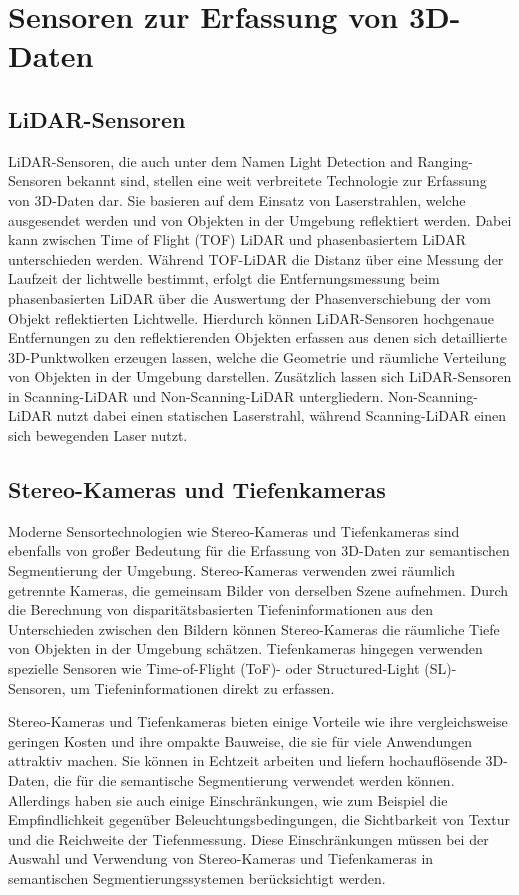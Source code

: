 \chapter{Sensoren zur Erfassung von 3D-Daten}

\section{LiDAR-Sensoren}
LiDAR-Sensoren, die auch unter dem Namen Light Detection and Ranging-Sensoren
bekannt sind, stellen eine weit verbreitete Technologie zur Erfassung von
3D-Daten dar. Sie basieren auf dem Einsatz von Laserstrahlen, welche
ausgesendet werden und von Objekten in der Umgebung reflektiert werden. Dabei
kann zwischen Time of Flight (TOF) LiDAR und phasenbasiertem LiDAR
unterschieden werden. Während TOF-LiDAR die Distanz über eine Messung der
Laufzeit der lichtwelle bestimmt, erfolgt die Entfernungsmessung beim
phasenbasierten LiDAR über die Auswertung der Phasenverschiebung der vom Objekt
reflektierten Lichtwelle. Hierdurch können LiDAR-Sensoren hochgenaue
Entfernungen zu den reflektierenden Objekten erfassen aus denen sich
detaillierte 3D-Punktwolken erzeugen lassen, welche die Geometrie und räumliche
Verteilung von Objekten in der Umgebung darstellen. Zusätzlich lassen sich
LiDAR-Sensoren in Scanning-LiDAR und Non-Scanning-LiDAR untergliedern.
Non-Scanning-LiDAR nutzt dabei einen statischen Laserstrahl, während
Scanning-LiDAR einen sich bewegenden Laser nutzt. \cite{8529992}

\section{Stereo-Kameras und Tiefenkameras}
Moderne Sensortechnologien wie Stereo-Kameras und Tiefenkameras sind ebenfalls
von großer Bedeutung für die Erfassung von 3D-Daten zur semantischen
Segmentierung der Umgebung. Stereo-Kameras verwenden zwei räumlich getrennte
Kameras, die gemeinsam Bilder von derselben Szene aufnehmen. Durch die
Berechnung von disparitätsbasierten Tiefeninformationen aus den Unterschieden
zwischen den Bildern können Stereo-Kameras die räumliche Tiefe von Objekten in
der Umgebung schätzen. Tiefenkameras hingegen verwenden spezielle Sensoren wie
Time-of-Flight (ToF)- oder Structured-Light (SL)-Sensoren, um
Tiefeninformationen direkt zu erfassen.

Stereo-Kameras und Tiefenkameras bieten einige Vorteile wie ihre
vergleichsweise geringen Kosten und ihre ompakte Bauweise, die sie für viele
Anwendungen attraktiv machen. Sie können in Echtzeit arbeiten und liefern
hochauflösende 3D-Daten, die für die semantische Segmentierung verwendet werden
können. Allerdings haben sie auch einige Einschränkungen, wie zum Beispiel die
Empfindlichkeit gegenüber Beleuchtungsbedingungen, die Sichtbarkeit von Textur
und die Reichweite der Tiefenmessung. Diese Einschränkungen müssen bei der
Auswahl und Verwendung von Stereo-Kameras und Tiefenkameras in semantischen
Segmentierungssystemen berücksichtigt werden.

